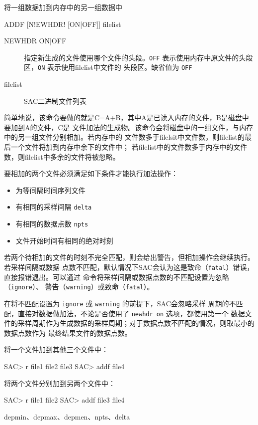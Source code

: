 \label{cmd:addf}

将一组数据加到内存中的另一组数据中

\begin{SACSTX}
ADDF [N!EWHDR! [ON|OFF]] filelist
\end{SACSTX}

\begin{description}
\item [NEWHDR ON|OFF] 指定新生成的文件使用哪个文件的头段。\texttt{OFF}
    表示使用内存中原文件的头段区，\texttt{ON} 表示使用filelist中文件的
    头段区。缺省值为 \texttt{OFF}
\item [filelist] SAC二进制文件列表
\end{description}

简单地说，该命令要做的就是C=A+B，其中A是已读入内存的文件，B是磁盘中要加到A的文件，C是
文件加法的生成物。该命令会将磁盘中的一组文件，与内存中的另一组文件分别相加。若内存中的
文件数多于filelsit中文件数，则filelist的最后一个文件将加到内存中余下的文件中；
若filelist中的文件数多于内存中的文件数，则filelist中多余的文件将被忽略。

要相加的两个文件必须满足如下条件才能执行加法操作：
\begin{itemize}
\item 为等间隔时间序列文件
\item 有相同的采样间隔 \texttt{delta}
\item 有相同的数据点数 \texttt{npts}
\item 文件开始时间有相同的绝对时刻
\end{itemize}

若两个待相加的文件的时刻不完全匹配，则会给出警告，但相加操作会继续执行。若采样间隔或数据
点数不匹配，默认情况下SAC会认为这是致命（\texttt{fatal}）错误，直接报错退出。可以通过 
 命令将采样间隔或数据点数的不匹配设置为忽略（\texttt{ignore}）、
警告（\texttt{warning}）或致命（\texttt{fatal}）。

在将不匹配设置为 \texttt{ignore} 或 \texttt{warning} 的前提下，SAC会忽略采样
周期的不匹配，直接对数据做加法，不论是否使用了 \texttt{newhdr on} 选项，都使用第一个
数据文件的采样周期作为生成数据的采样周期；对于数据点数不匹配的情况，则取最小的数据点数作为
最终结果文件的数据点数。

将一个文件加到其他三个文件中：
\begin{SACCode}
SAC> r file1 file2 file3
SAC> addf file4
\end{SACCode}

将两个文件分别加到另两个文件中：
\begin{SACCode}
SAC> r file1 file2
SAC> addf file3 file4
\end{SACCode}

depmin、depmax、depmen、npts、delta

